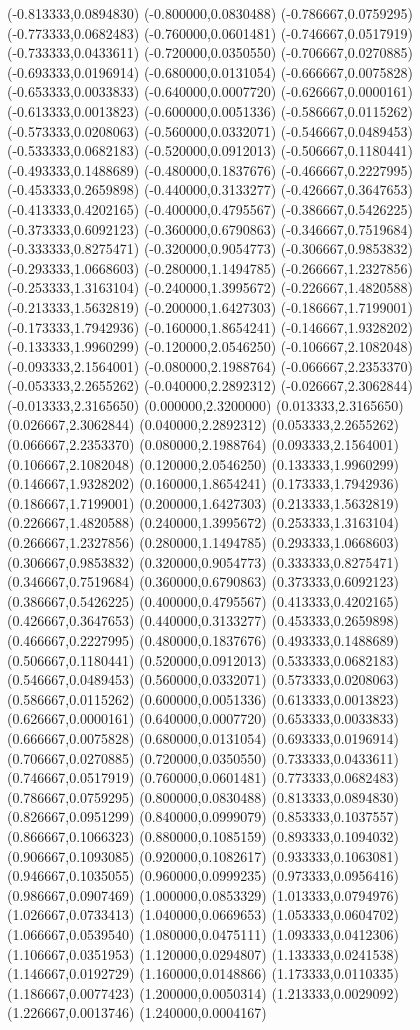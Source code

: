 \begin{solution}
{(-0.813333,0.0894830) (-0.800000,0.0830488) (-0.786667,0.0759295) (-0.773333,0.0682483) (-0.760000,0.0601481) (-0.746667,0.0517919) (-0.733333,0.0433611) (-0.720000,0.0350550) (-0.706667,0.0270885) (-0.693333,0.0196914) (-0.680000,0.0131054) (-0.666667,0.0075828) (-0.653333,0.0033833) (-0.640000,0.0007720) (-0.626667,0.0000161) (-0.613333,0.0013823) (-0.600000,0.0051336) (-0.586667,0.0115262) (-0.573333,0.0208063) (-0.560000,0.0332071) (-0.546667,0.0489453) (-0.533333,0.0682183) (-0.520000,0.0912013) (-0.506667,0.1180441) (-0.493333,0.1488689) (-0.480000,0.1837676) (-0.466667,0.2227995) (-0.453333,0.2659898) (-0.440000,0.3133277) (-0.426667,0.3647653) (-0.413333,0.4202165) (-0.400000,0.4795567) (-0.386667,0.5426225) (-0.373333,0.6092123) (-0.360000,0.6790863) (-0.346667,0.7519684) (-0.333333,0.8275471) (-0.320000,0.9054773) (-0.306667,0.9853832) (-0.293333,1.0668603) (-0.280000,1.1494785) (-0.266667,1.2327856) (-0.253333,1.3163104) (-0.240000,1.3995672) (-0.226667,1.4820588) (-0.213333,1.5632819) (-0.200000,1.6427303) (-0.186667,1.7199001) (-0.173333,1.7942936) (-0.160000,1.8654241) (-0.146667,1.9328202) (-0.133333,1.9960299) (-0.120000,2.0546250) (-0.106667,2.1082048) (-0.093333,2.1564001) (-0.080000,2.1988764) (-0.066667,2.2353370) (-0.053333,2.2655262) (-0.040000,2.2892312) (-0.026667,2.3062844) (-0.013333,2.3165650) (0.000000,2.3200000) (0.013333,2.3165650) (0.026667,2.3062844) (0.040000,2.2892312) (0.053333,2.2655262) (0.066667,2.2353370) (0.080000,2.1988764) (0.093333,2.1564001) (0.106667,2.1082048) (0.120000,2.0546250) (0.133333,1.9960299) (0.146667,1.9328202) (0.160000,1.8654241) (0.173333,1.7942936) (0.186667,1.7199001) (0.200000,1.6427303) (0.213333,1.5632819) (0.226667,1.4820588) (0.240000,1.3995672) (0.253333,1.3163104) (0.266667,1.2327856) (0.280000,1.1494785) (0.293333,1.0668603) (0.306667,0.9853832) (0.320000,0.9054773) (0.333333,0.8275471) (0.346667,0.7519684) (0.360000,0.6790863) (0.373333,0.6092123) (0.386667,0.5426225) (0.400000,0.4795567) (0.413333,0.4202165) (0.426667,0.3647653) (0.440000,0.3133277) (0.453333,0.2659898) (0.466667,0.2227995) (0.480000,0.1837676) (0.493333,0.1488689) (0.506667,0.1180441) (0.520000,0.0912013) (0.533333,0.0682183) (0.546667,0.0489453) (0.560000,0.0332071) (0.573333,0.0208063) (0.586667,0.0115262) (0.600000,0.0051336) (0.613333,0.0013823) (0.626667,0.0000161) (0.640000,0.0007720) (0.653333,0.0033833) (0.666667,0.0075828) (0.680000,0.0131054) (0.693333,0.0196914) (0.706667,0.0270885) (0.720000,0.0350550) (0.733333,0.0433611) (0.746667,0.0517919) (0.760000,0.0601481) (0.773333,0.0682483) (0.786667,0.0759295) (0.800000,0.0830488) (0.813333,0.0894830) (0.826667,0.0951299) (0.840000,0.0999079) (0.853333,0.1037557) (0.866667,0.1066323) (0.880000,0.1085159) (0.893333,0.1094032) (0.906667,0.1093085) (0.920000,0.1082617) (0.933333,0.1063081) (0.946667,0.1035055) (0.960000,0.0999235) (0.973333,0.0956416) (0.986667,0.0907469) (1.000000,0.0853329) (1.013333,0.0794976) (1.026667,0.0733413) (1.040000,0.0669653) (1.053333,0.0604702) (1.066667,0.0539540) (1.080000,0.0475111) (1.093333,0.0412306) (1.106667,0.0351953) (1.120000,0.0294807) (1.133333,0.0241538) (1.146667,0.0192729) (1.160000,0.0148866) (1.173333,0.0110335) (1.186667,0.0077423) (1.200000,0.0050314) (1.213333,0.0029092) (1.226667,0.0013746) (1.240000,0.0004167) }
\end{solution}
